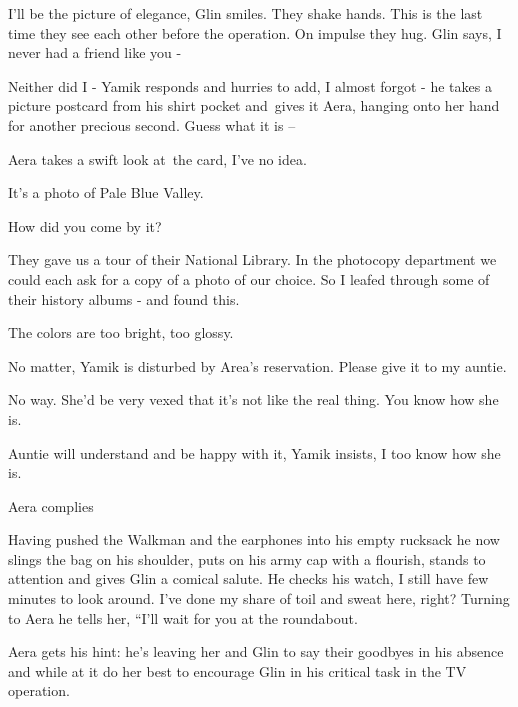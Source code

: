 \documentclass[twoside,11pt]{book}
\begin{document}
{\textquotedbl}I'll be the picture of elegance,{\textquotedbl} Glin smiles. They shake hands. This is the last time they
see each other before the operation. On impulse they hug. Glin says, {\textquotedbl}I never had a friend like you
-{\textquotedbl} 

{\textquotedbl}Neither did I -{\textquotedbl} Yamik responds and hurries to add, {\textquotedbl}I almost forgot
-{\textquotedbl} he takes a picture postcard from his shirt pocket and~gives it Aera, hanging onto her hand for another
precious second. {\textquotedbl}Guess what it is --{\textquotedbl} 

Aera takes a swift look at{\ }the card, {\textquotedbl}I've no idea.{\textquotedbl} 

{\textquotedbl}It's a photo of Pale Blue Valley.{\textquotedbl} 

{\textquotedbl}How did you come by it?{\textquotedbl} \ 

{\textquotedbl}They gave us a tour of their National Library. In the photocopy department we could each ask for a copy
of a photo of our choice. So I leafed through some of their history albums - and found this.{\textquotedbl} 

{\textquotedbl}The colors are too bright, too glossy.{\textquotedbl} 

{\textquotedbl}No matter,{\textquotedbl} Yamik is disturbed by Area's reservation. {\textquotedbl}Please give it to my
auntie.{\textquotedbl} 

{\textquotedbl}No way. She'd be very vexed that it's not like the real thing. You know how she is.{\textquotedbl} 

{\textquotedbl}Auntie will understand and be happy with it,{\textquotedbl} Yamik insists, {\textquotedbl}I too know how
she is.{\textquotedbl}

Aera complies

Having pushed the Walkman and the earphones into his empty rucksack he now slings the bag on his shoulder, puts on his
army cap with a flourish, stands to attention and gives Glin a comical salute. He checks his watch, {\textquotedbl}I
still have few minutes to look around. I've done my share of toil and sweat here, right?{\textquotedbl} Turning to Aera
he tells her, ``I'll wait for you at the roundabout.{\textquotedbl}

Aera gets his hint: he's leaving her and Glin to say their goodbyes in his absence and while at it do her best to
encourage Glin in his critical task in the TV operation.\ 
\end{document}
